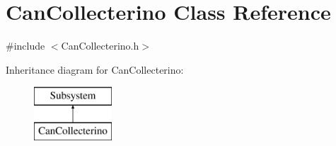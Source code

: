 \hypertarget{class_can_collecterino}{}\section{Can\+Collecterino Class Reference}
\label{class_can_collecterino}


{\ttfamily \#include $<$Can\+Collecterino.\+h$>$}

Inheritance diagram for Can\+Collecterino\+:\begin{figure}[H]
\begin{center}
\leavevmode
\includegraphics[height=2.000000cm]{class_can_collecterino}
\end{center}
\end{figure}
